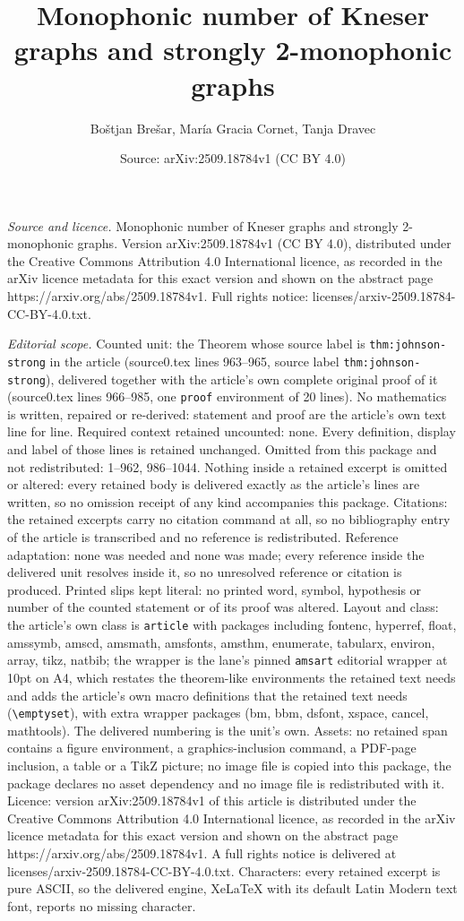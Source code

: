 \documentclass[10pt,a4paper]{amsart}
\title[Monophonic number of Kneser graphs and strongly 2-monophonic]{Monophonic number of Kneser graphs and strongly 2-monophonic graphs}
\author{Bo\v{s}tjan Bre\v{s}ar, Mar\'ia Gracia Cornet, Tanja Dravec}
\date{Source: arXiv:2509.18784v1 (CC BY 4.0)}
\begin{document}
\maketitle

\noindent\emph{Source and licence.} Monophonic number of Kneser graphs and strongly 2-monophonic graphs. Version arXiv:2509.18784v1 (CC BY 4.0), distributed under the Creative Commons Attribution 4.0 International licence, as recorded in the arXiv licence metadata for this exact version and shown on the abstract page https://arxiv.org/abs/2509.18784v1. Full rights notice: licenses/arxiv-2509.18784-CC-BY-4.0.txt.\par\smallskip

\noindent\textit{Editorial scope.} Counted unit: the Theorem whose source label is \texttt{thm:johnson-strong} in the article (source0.tex lines 963--965, source label \texttt{thm:johnson-strong}), delivered together with the article's own complete original proof of it (source0.tex lines 966--985, one \texttt{proof} environment of 20 lines). No mathematics is written, repaired or re-derived: statement and proof are the article's own text line for line. Required context retained uncounted: none. Every definition, display and label of those lines is retained unchanged. Omitted from this package and not redistributed: 1--962, 986--1044. Nothing inside a retained excerpt is omitted or altered: every retained body is delivered exactly as the article's lines are written, so no omission receipt of any kind accompanies this package. Citations: the retained excerpts carry no citation command at all, so no bibliography entry of the article is transcribed and no reference is redistributed. Reference adaptation: none was needed and none was made; every reference inside the delivered unit resolves inside it, so no unresolved reference or citation is produced. Printed slips kept literal: no printed word, symbol, hypothesis or number of the counted statement or of its proof was altered. Layout and class: the article's own class is \texttt{article} with packages including fontenc, hyperref, float, amssymb, amscd, amsmath, amsfonts, amsthm, enumerate, tabularx, environ, array, tikz, natbib; the wrapper is the lane's pinned \texttt{amsart} editorial wrapper at 10pt on A4, which restates the theorem-like environments the retained text needs and adds the article's own macro definitions that the retained text needs (\texttt{\textbackslash emptyset}), with extra wrapper packages (bm, bbm, dsfont, xspace, cancel, mathtools). The delivered numbering is the unit's own. Assets: no retained span contains a figure environment, a graphics-inclusion command, a PDF-page inclusion, a table or a TikZ picture; no image file is copied into this package, the package declares no asset dependency and no image file is redistributed with it. Licence: version arXiv:2509.18784v1 of this article is distributed under the Creative Commons Attribution 4.0 International licence, as recorded in the arXiv licence metadata for this exact version and shown on the abstract page https://arxiv.org/abs/2509.18784v1. A full rights notice is delivered at licenses/arxiv-2509.18784-CC-BY-4.0.txt. Characters: every retained excerpt is pure ASCII, so the delivered engine, XeLaTeX with its default Latin Modern text font, reports no missing character.
\end{document}
